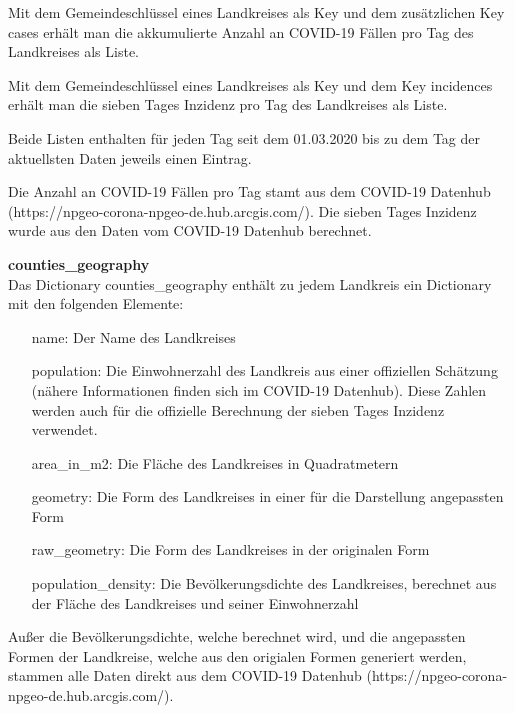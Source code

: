 Mit dem Gemeindeschlüssel eines Landkreises als Key und dem zusätzlichen Key \glqq{}cases\grqq{} erhält man die akkumulierte Anzahl an COVID-19 Fällen pro Tag des Landkreises als Liste.

Mit dem Gemeindeschlüssel eines Landkreises als Key und dem Key \glqq{}incidences\grqq{} erhält man die sieben Tages Inzidenz pro Tag des Landkreises als Liste.

Beide Listen enthalten für jeden Tag seit dem 01.03.2020 bis zu dem Tag der aktuellsten Daten jeweils einen Eintrag.

Die Anzahl an COVID-19 Fällen pro Tag stamt aus dem \glqq{}COVID-19 Datenhub\grqq{} (https://npgeo-corona-npgeo-de.hub.arcgis.com/). Die sieben Tages Inzidenz wurde aus den Daten vom COVID-19 Datenhub berechnet.

\textbf{counties\_geography}\\
Das Dictionary counties\_geography enthält zu jedem Landkreis ein Dictionary mit den folgenden Elemente:
\begin{itemize}
    \item[name:] Der Name des Landkreises
    \item[population:] Die Einwohnerzahl des Landkreis aus einer offiziellen Schätzung (nähere Informationen finden sich im COVID-19 Datenhub). Diese Zahlen werden auch für die offizielle Berechnung der sieben Tages Inzidenz verwendet.
    \item[area\_in\_m2:] Die Fläche des Landkreises in Quadratmetern
    \item[geometry:] Die Form des Landkreises in einer für die Darstellung angepassten Form
    \item[raw\_geometry:] Die Form des Landkreises in der originalen Form
    \item[population\_density:] Die Bevölkerungsdichte des Landkreises, berechnet aus der Fläche des Landkreises und seiner Einwohnerzahl
\end{itemize}
Außer die Bevölkerungsdichte, welche berechnet wird, und die angepassten Formen der Landkreise, welche aus den origialen Formen generiert werden, stammen alle Daten direkt aus dem \glqq{}COVID-19 Datenhub\grqq{} (https://npgeo-corona-npgeo-de.hub.arcgis.com/).

